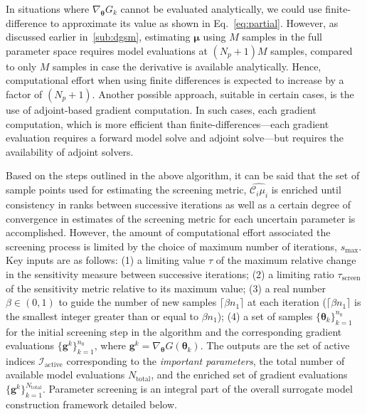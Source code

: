 In situations where $\nabla_{\bm{\theta}}G_k$ cannot be evaluated analytically,
we could use finite-difference to approximate its value as shown in
Eq.~\ref{eq:partial}. However, as discussed earlier in~\ref{sub:dgsm},
estimating $\bm{\mu}$  using $M$ samples in the full parameter space requires
model evaluations at $(N_p+1)M$ samples, compared to only $M$ samples in case
the derivative is available analytically. Hence, computational effort when
using finite differences is expected to increase by a factor of $(N_p+1)$.
Another possible approach, suitable in certain cases, is the use of
adjoint-based gradient computation. In such cases, each gradient computation,
which is more efficient than finite-differences---each gradient
evaluation requires a forward model solve and adjoint solve---but 
requires the availability of adjoint solvers.

Based on the steps outlined in the above algorithm, it can be said that the set
of sample points used for estimating the screening metric,
$\widehat{\mathcal{C}_i\mu_i}$ is enriched until consistency in ranks between
successive iterations as well as a certain degree of convergence in estimates
of the screening metric for each uncertain parameter is accomplished. However,
the amount of computational effort associated the screening process is limited
by the choice of maximum number of iterations, $s_\text{max}$. 
Key inputs
are as follows: (1) 
a limiting value $\tau$ of the maximum relative change in the sensitivity
measure between successive iterations; (2) 
a limiting ratio $\tau_\text{screen}$ of the sensitivity metric 
relative to its maximum value;
(3) a real number $\beta \in (0, 1)$ to 
guide the number of new samples $\lceil \beta n_1 \rceil$ 
at each iteration ($\lceil \beta n_1
\rceil$ 
is the smallest integer greater than or equal to $\beta n_1$); 
(4) a set of samples $\{ \bm{\theta}_k \}_{k = 1}^{n_0}$ 
for the initial screening step in
the algorithm and the corresponding gradient evaluations 
$\{ \bm{g}^k \}_{k=1}^{n_0}$, where
$\bm{g}^k = \nabla_{\bm{\theta}} G(\bm{\theta}_k)$. 
The outputs are the set of active
indices $\mathcal{I}_\text{active}$ corresponding to the 
\emph{important parameters}, the total number of available model 
evaluations $N_\text{total}$, and the enriched set of gradient evaluations 
$\{ \bm{g}^k\}_{k=1}^{N_\text{total}}$. 
Parameter screening is an integral part of the
overall surrogate model construction framework 
detailed below.
 
